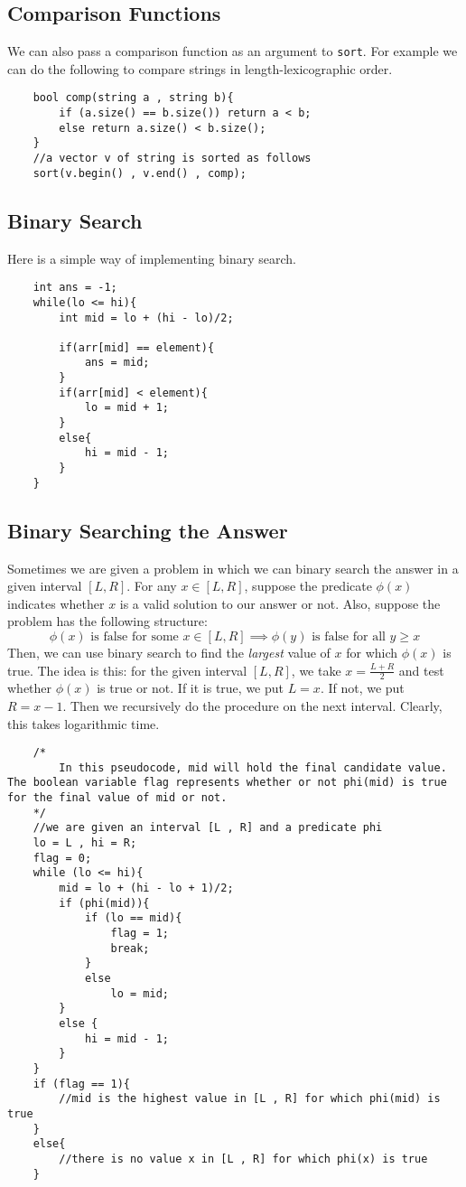 \documentclass[12pt,a4paper]{amsart}
\numberwithin{equation}{section}
\theoremstyle{definition}
\begin{document}
\subsection{Comparison Functions} We can also pass a comparison function as an argument to \verb|sort|. For example we can do the following to compare strings in length-lexicographic order.
\begin{lstlisting}
    bool comp(string a , string b){
        if (a.size() == b.size()) return a < b;
        else return a.size() < b.size();
    }
    //a vector v of string is sorted as follows
    sort(v.begin() , v.end() , comp);
\end{lstlisting}

\subsection{Binary Search} Here is a simple way of implementing binary search. 

\begin{lstlisting}
    int ans = -1;
    while(lo <= hi){
        int mid = lo + (hi - lo)/2;
    
        if(arr[mid] == element){
            ans = mid;
        }
        if(arr[mid] < element){
            lo = mid + 1;
        }
        else{
            hi = mid - 1;
        }
    }
\end{lstlisting}

\subsection{Binary Searching the Answer} Sometimes we are given a problem in which we can binary search the answer in a given interval $[L , R]$. For any $x\in [L , R]$, suppose the predicate $\phi(x)$ indicates whether $x$ is a valid solution to our answer or not. Also, suppose the problem has the following structure: $$\phi(x)\text{ is false for some $x\in[L , R]$}\implies \phi(y)\text{ is false for all }y\ge x$$
Then, we can use binary search to find the \textit{largest} value of $x$ for which $\phi(x)$ is true. The idea is this: for the given interval $[L , R]$, we take $x = \frac{L + R}{2}$ and test whether $\phi(x)$ is true or not. If it is true, we put $L = x$. If not, we put $R = x - 1$. Then we recursively do the procedure on the next interval. Clearly, this takes logarithmic time.  

\begin{lstlisting}
    /*
        In this pseudocode, mid will hold the final candidate value. The boolean variable flag represents whether or not phi(mid) is true for the final value of mid or not. 
    */
    //we are given an interval [L , R] and a predicate phi
    lo = L , hi = R;
    flag = 0;
    while (lo <= hi){
        mid = lo + (hi - lo + 1)/2;
        if (phi(mid)){
            if (lo == mid){
                flag = 1;
                break;
            }
            else 
                lo = mid;
        }
        else {
            hi = mid - 1;
        }
    }
    if (flag == 1){
        //mid is the highest value in [L , R] for which phi(mid) is true
    }
    else{
        //there is no value x in [L , R] for which phi(x) is true
    }
\end{lstlisting}
\end{document}

